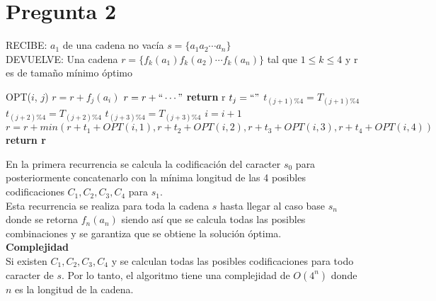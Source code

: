 \documentclass{article}
\begin{document}

    
\section*{Pregunta 2}

\vspace{0.5cm}

\noindent RECIBE: $a_{1}$ de una cadena no vacía $s=\{a_1a_2\cdots a_n\}$ \\
DEVUELVE: Una cadena $r=\{f_k(a_1)f_k(a_2)\cdots f_k(a_n)\}$ tal que $1 \leq k \leq 4$ y r es
de tamaño mínimo óptimo
\begin{algorithmic}[1]
\item[]{OPT($i$, $j$)}
\State $r=r+f_j(a_i)$
\Else 
\State $r=r+``\cdots"$
\EndIf
{}
\State \textbf{return} r
\EndIf
\State $t_j = ``"$
\State $t_{(j+1)\%4} = T_{(j+1)\%4}$
\State $t_{(j+2)\%4} = T_{(j+2)\%4}$
\State $t_{(j+3)\%4} = T_{(j+3)\%4}$
\State $i = i+1$
\State $r=r+min(r+t_1+OPT(i,1),r+t_2+OPT(i,2),
r+t_3+OPT(i,3), r+t_4+OPT(i,4))$
\State \textbf{return r} 
\end{algorithmic}

\vspace{1cm}

En la primera recurrencia se calcula la codificación del caracter $s_0$ para posteriormente concatenarlo
con la mínima longitud de las 4 posibles codificaciones $C_1,C_2,C_3,C_4$ para $s_1$.\\
Esta recurrencia se realiza para toda la cadena $s$ hasta llegar al caso base $s_n$ donde se retorna $f_n(a_n)$
siendo así que se calcula todas las posibles combinaciones y se garantiza que se obtiene la solución óptima.\\

\textbf{Complejidad}\\
Si existen $C_1,C_2,C_3,C_4$ y se calculan todas las posibles codificaciones para todo caracter de $s$.
Por lo tanto, el algoritmo tiene una complejidad de $O(4^n)$ donde $n$ es la longitud de la cadena.
\end{document}
